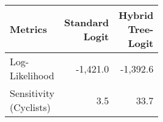\begin{tabular}{K{0.5\linewidth} rr}
\toprule
Metrics & Standard Logit & Hybrid Tree-Logit \tabularnewline
\midrule

Log-Likelihood & -1,421.0 & -1,392.6\\
Sensitivity (Cyclists) & 3.5 & 33.7\\

\bottomrule
\end{tabular}
